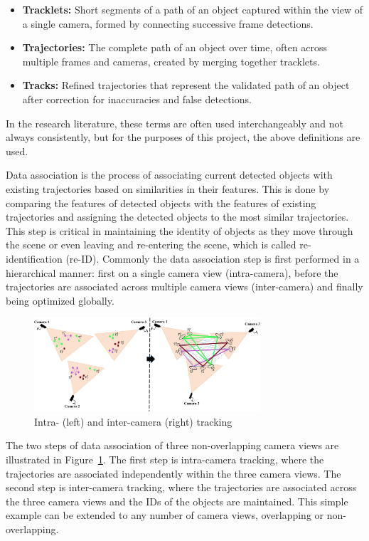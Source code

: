\begin{itemize}
    \item \textbf{Tracklets:} Short segments of a path of an object captured within the view of a single camera, formed by connecting successive frame detections.
    \item \textbf{Trajectories:} The complete path of an object over time, often across multiple frames and cameras, created by merging together tracklets.
    \item \textbf{Tracks:} Refined trajectories that represent the validated path of an object after correction for inaccuracies and false detections.
\end{itemize}

In the research literature, these terms are often used interchangeably and not always consistently, but for the purposes of this project, the above definitions are used.

Data association is the process of associating current detected objects with existing trajectories based on similarities in their features. This is done by comparing the features of detected objects with the features of existing trajectories and assigning the detected objects to the most similar trajectories. This step is critical in maintaining the identity of objects as they move through the scene or even leaving and re-entering the scene, which is called re-identification (re-ID). Commonly the data association step is first performed in a hierarchical manner: first on a single camera view (intra-camera), before the trajectories are associated across multiple camera views (inter-camera) and finally being optimized globally.

\begin{figure}[ht]
    \centering
    \includegraphics[width=0.75\textwidth]{resources/fig/Tesfaye19-intra_inter_camera_tracking.png}
    \caption{Intra- (left) and inter-camera (right) tracking~\cite[Fig.~1]{Tesfaye19}}\label{fig:intra_inter_camera_tracking}
\end{figure}

The two steps of data association of three non-overlapping camera views are illustrated in Figure~\ref{fig:intra_inter_camera_tracking}. The first step is intra-camera tracking, where the trajectories are associated independently within the three camera views. The second step is inter-camera tracking, where the trajectories are associated across the three camera views and the IDs of the objects are maintained. This simple example can be extended to any number of camera views, overlapping or non-overlapping.


